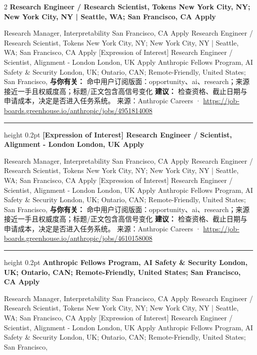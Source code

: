 \documentclass[10.5pt]{ctexart}
\begin{document}
\begin{multicols}{2}
{\large\bfseries Research Engineer / Research Scientist, Tokens New York City, NY; New York City, NY | Seattle, WA; San Francisco, CA Apply}\par
[Expression of Interest] Research Manager, Interpretability San Francisco, CA Apply Research Engineer / Research Scientist, Tokens New York City, NY; New York City, NY | Seattle, WA; San Francisco, CA Apply [Expression of Interest] Research Engineer / Scientist, Alignment - London London, UK Apply Anthropic Fellows Program, AI Safety \& Security London, UK; Ontario, CAN; Remote-Friendly, United States; San Francisco, 
\textbf{与你有关：} 命中用户订阅版面：opportunity、ai、research；来源接近一手且权威度高；标题/正文包含高信号变化
\textbf{建议：} 检查资格、截止日期与申请成本，决定是否进入任务系统。
{\footnotesize\color{ormuted} 来源：Anthropic Careers · \url{https://job-boards.greenhouse.io/anthropic/jobs/4951814008}}
\vspace{2mm}
\hrule height 0.2pt
\vspace{2mm}
{\large\bfseries [Expression of Interest] Research Engineer / Scientist, Alignment - London London, UK Apply}\par
[Expression of Interest] Research Manager, Interpretability San Francisco, CA Apply Research Engineer / Research Scientist, Tokens New York City, NY; New York City, NY | Seattle, WA; San Francisco, CA Apply [Expression of Interest] Research Engineer / Scientist, Alignment - London London, UK Apply Anthropic Fellows Program, AI Safety \& Security London, UK; Ontario, CAN; Remote-Friendly, United States; San Francisco, 
\textbf{与你有关：} 命中用户订阅版面：opportunity、ai、research；来源接近一手且权威度高；标题/正文包含高信号变化
\textbf{建议：} 检查资格、截止日期与申请成本，决定是否进入任务系统。
{\footnotesize\color{ormuted} 来源：Anthropic Careers · \url{https://job-boards.greenhouse.io/anthropic/jobs/4610158008}}
\vspace{2mm}
\hrule height 0.2pt
\vspace{2mm}
{\large\bfseries Anthropic Fellows Program, AI Safety \& Security London, UK; Ontario, CAN; Remote-Friendly, United States; San Francisco, CA Apply}\par
[Expression of Interest] Research Manager, Interpretability San Francisco, CA Apply Research Engineer / Research Scientist, Tokens New York City, NY; New York City, NY | Seattle, WA; San Francisco, CA Apply [Expression of Interest] Research Engineer / Scientist, Alignment - London London, UK Apply Anthropic Fellows Program, AI Safety \& Security London, UK; Ontario, CAN; Remote-Friendly, United States; San Francisco, 

\end{multicols}
\end{document}

